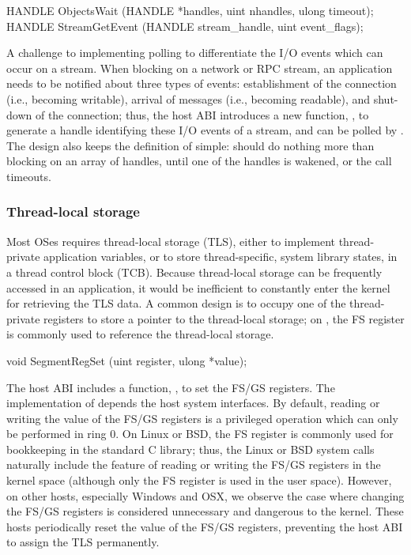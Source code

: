 \begin{paldef}
HANDLE ObjectsWait    (HANDLE *handles, uint nhandles,
                       ulong timeout);
HANDLE StreamGetEvent (HANDLE stream_handle,
                       uint event_flags);
\end{paldef}


A challenge to implementing polling
to differentiate the I/O events which can occur on a stream.
When blocking on a network or RPC stream, an application needs to be notified
about three types of events:
establishment of the connection (i.e., becoming writable), arrival of messages (i.e., becoming readable), and shut-down of the connection;
thus, the \graphene{} host ABI introduces a new function,
,
to generate a handle identifying these I/O events of a stream,
and can be polled by .
The design also keeps the definition of  simple:
 should do nothing more than blocking on an array of handles,
until one of the handles
is wakened, or the call timeouts.


\subsubsection*{Thread-local storage}


Most OSes requires thread-local storage (TLS),
either to implement thread-private application variables, or to store thread-specific, system library states, in a thread control block (TCB).
Because thread-local storage can be frequently accessed
in an application,
it would be inefficient to constantly
enter the kernel for retrieving the TLS data.
A common design is to occupy one of the thread-private registers
to store a pointer to the thread-local storage;
on \graphenearch{}, the FS register is commonly used to reference the thread-local storage.




\begin{paldef}
void SegmentRegSet (uint register, ulong *value);
\end{paldef}



The host ABI includes a function, , to set the FS/GS registers.
The implementation of 
depends the host system interfaces. 
By default, reading or writing the value of the FS/GS registers is a privileged operation
which can only be performed in ring 0.
On Linux or BSD, the FS register is commonly used for bookkeeping in the standard C library;
thus, the Linux or BSD system calls naturally include the feature of reading or writing the FS/GS registers in the kernel space (although only the FS register is used in the user space).
However, on other hosts, especially Windows and OSX,
we observe the case where changing the FS/GS registers is considered unnecessary and dangerous to the kernel.
These hosts periodically reset the value of the FS/GS registers,
preventing the host ABI to assign the TLS permanently.


